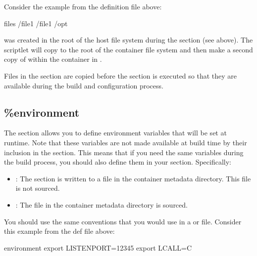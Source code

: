\documentclass[letterpaper,10pt,english]{sphinxmanual}
\begin{document}
Consider the example from the definition file above:

%
\begin{sphinxVerbatim}[commandchars=\\\{\}]
\PYGZpc{}files
    /file1
    /file1 /opt
\end{sphinxVerbatim}

 was created in the root of the host file system during the 
section (see above).  The  scriptlet will copy  to the root
of the container file system and then make a second copy of  within the
container in .

Files in the  section are copied before the  section is
executed so that they are available during the build and configuration process.


\subsection{\%environment}
\label{\detokenize{definition_files:environment}}
The  section allows you to define environment variables that
will be set at runtime. Note that these variables are not made available at
build time by their inclusion in the  section. This means that
if you need the same variables during the build process, you should also define
them in your  section. Specifically:
\begin{itemize}
\item {} 
: The  section is written to a file in the
container metadata directory. This file is not sourced.

\item {} 
: The file in the container metadata directory is sourced.

\end{itemize}

You should use the same conventions that you would use in a  or
 file. Consider this example from the def file above:

%
\begin{sphinxVerbatim}[commandchars=\\\{\}]
\PYGZpc{}environment
    export LISTEN\PYGZus{}PORT=12345
    export LC\PYGZus{}ALL=C
\end{sphinxVerbatim}
\end{document}
